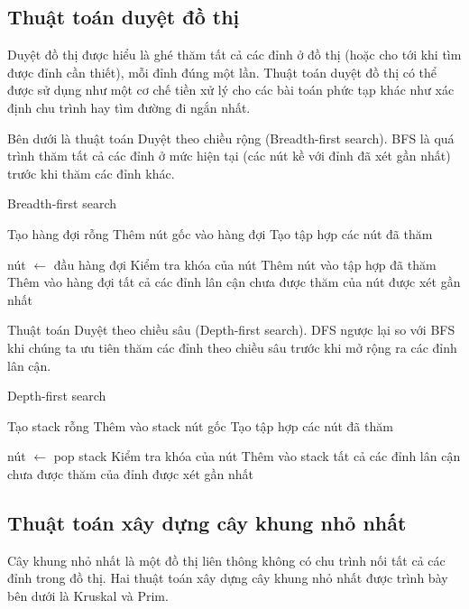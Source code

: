 \subsection{Thuật toán duyệt đồ thị}
Duyệt đồ thị được hiểu là ghé thăm tất cả các đỉnh ở đồ thị (hoặc cho tới khi tìm được đỉnh cần thiết), mỗi đỉnh đúng một lần. Thuật toán duyệt đồ thị có thể được sử dụng như một cơ chế tiền xử lý cho các bài toán phức tạp khác như xác định chu trình hay tìm đường đi ngắn nhất.


Bên dưới là thuật toán Duyệt theo chiều rộng (Breadth-first search). BFS là quá trình thăm tất cả các đỉnh ở mức hiện tại (các nút kề với đỉnh đã xét gần nhất) trước khi thăm các đỉnh khác.


\begin{algorithm}
\caption{Breadth-first search}\label{euclid}
\begin{algorithmic}[1]
	\State Tạo hàng đợi rỗng
	\State Thêm nút gốc vào hàng đợi
	\State Tạo tập hợp các nút đã thăm
			
		\State nút $\leftarrow$ đầu hàng đợi
		\State Kiểm tra khóa của nút
		\State Thêm nút vào tập hợp đã thăm
		\State Thêm vào hàng đợi tất cả các đỉnh lân cận chưa được thăm của nút được xét gần nhất
	\EndWhile
\EndProcedure
\end{algorithmic}
\end{algorithm}


Thuật toán Duyệt theo chiều sâu (Depth-first search). DFS ngược lại so với BFS khi chúng ta ưu tiên thăm các đỉnh theo chiều sâu trước khi mở rộng ra các đỉnh lân cận.


\begin{algorithm}
\caption{Depth-first search}\label{euclid}
\begin{algorithmic}[1]
	\State Tạo stack rỗng 
	\State Thêm vào stack nút gốc
	\State Tạo tập hợp các nút đã thăm 
			
		\State nút $\leftarrow$ pop stack
		\State Kiểm tra khóa của nút
		\State Thêm vào stack tất cả các đỉnh lân cận chưa được thăm của đỉnh được xét gần nhất
	\EndWhile
\EndProcedure
\end{algorithmic}
\end{algorithm}

\subsection{Thuật toán xây dựng cây khung nhỏ nhất}
Cây khung nhỏ nhất là một đồ thị liên thông không có chu trình nối tất cả các đỉnh trong đồ thị. Hai thuật toán xây dựng cây khung nhỏ nhất được trình bày bên dưới là Kruskal và Prim.

